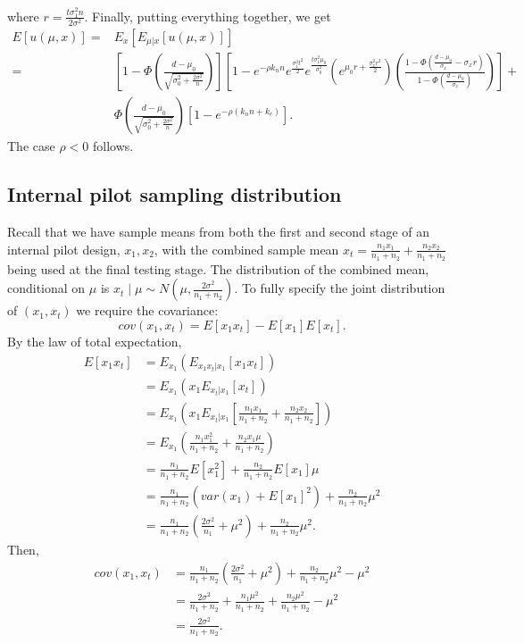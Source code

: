 \documentclass[sagev, Crown]{sagej} %
\begin{document}
where $r = \frac{t \sigma_1^2 n}{2\sigma^2}$. Finally, putting everything together, we get
\begin{align*}
E[u(\mu, x)] =& E_x\left[ E_{\mu | x} [u(\mu, x)] \right] \\
 =& \left[ 1- \Phi\left(\frac{d-\mu_0}{\sqrt{\sigma_0^2 + \frac{2\sigma^2}{n}}} \right)  \right] \left[ 1 - e^{-\rho k_n n} e^{\frac{\sigma_1^2 t^2}{2}} e^{\frac{t\sigma_1^2 \mu_0}{\sigma_0^2}} \left( e^{\mu_0 r + \frac{\sigma_x^2 r^2}{2} } \right) \left(\frac{1 - \Phi(\frac{d-\mu_0}{\sigma_x} - \sigma_x r)}{1 - \Phi(\frac{d-\mu_0}{\sigma_x})} \right)  \right] + \\
 & \Phi\left(\frac{d-\mu_0}{\sqrt{\sigma_0^2 + \frac{2\sigma^2}{n}}} \right) \left[1 - e^{-\rho(k_n n + k_c)}\right].
\end{align*}
The case $\rho < 0$ follows.


\subsection*{Internal pilot sampling distribution}

Recall that we have sample means from both the first and second stage of an internal pilot design, $x_1, x_2$, with the combined sample mean $x_t = \frac{n_1 x_1}{n_1 + n_2} + \frac{n_2 x_2}{n_1 + n_2}$ being used at the final testing stage. The distribution of the combined mean, conditional on $\mu$ is $x_t \mid \mu \sim N\left( \mu, \frac{2\sigma^2}{n_1 + n_2} \right)$. To fully specify the joint distribution of $(x_1, x_t)$ we require the covariance:
$$
cov(x_1, x_t) = E[x_1 x_t] - E[x_1] E[x_t].
$$
By the law of total expectation,
\begin{align*}
E[x_1 x_t] &= E_{x_1} ( E_{x_1 x_t | x_1}[x_1 x_t] ) \\
&= E_{x_1} ( x_1 E_{x_t | x_1}[x_t] ) \\
&= E_{x_1} \left( x_1 E_{x_t | x_1}\left[\frac{n_1 x_1}{n_1 + n_2} + \frac{n_2 x_2}{n_1 + n_2}\right] \right) \\
&= E_{x_1} \left( \frac{n_1 x_1^2}{n_1 + n_2} + \frac{n_2 x_1 \mu}{n_1 + n_2} \right) \\
&= \frac{n_1}{n_1 + n_2} E[x_1^2] + \frac{n_2}{n_1 + n_2} E[x_1] \mu \\
&= \frac{n_1}{n_1 + n_2} (var(x_1) + E[x_1]^2) + \frac{n_2}{n_1 + n_2} \mu^2 \\
&= \frac{n_1}{n_1 + n_2} \left(\frac{2\sigma^2}{n_1} + \mu^2\right) + \frac{n_2}{n_1 + n_2} \mu^2.
\end{align*}
Then,
\begin{align*}
cov(x_1, x_t) &= \frac{n_1}{n_1 + n_2} \left(\frac{2\sigma^2}{n_1} + \mu^2\right) + \frac{n_2}{n_1 + n_2} \mu^2 - \mu^2 \\
&= \frac{2\sigma^2}{n_1 + n_2} + \frac{n_1 \mu^2}{n_1 + n_2} + \frac{n_2 \mu^2}{n_1 + n_2} - \mu^2 \\
&= \frac{2\sigma^2}{n_1 + n_2} .
\end{align*}
\end{document}
